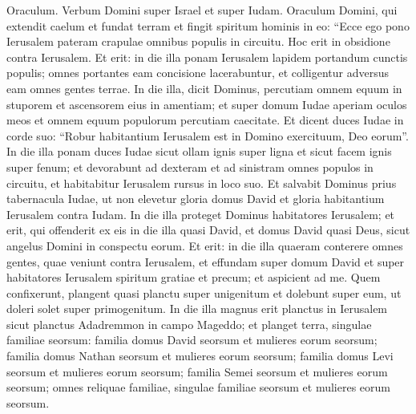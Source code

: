 \begin{biblechapter}  
\verse Oraculum. Verbum Domini super Israel et super Iudam. Oraculum Domini, qui extendit caelum et fundat terram et fingit spiritum hominis in eo: 
\verse “Ecce ego pono Ierusalem pateram crapulae omnibus populis in circuitu. Hoc erit in obsidione contra Ierusalem. 
\verse Et erit: in die illa ponam Ierusalem lapidem portandum cunctis populis; omnes portantes eam concisione lacerabuntur, et colligentur adversus eam omnes gentes terrae. 
\verse In die illa, dicit Dominus, percutiam omnem equum in stuporem et ascensorem eius in amentiam; et super domum Iudae aperiam oculos meos et omnem equum populorum percutiam caecitate. 
\verse Et dicent duces Iudae in corde suo: “Robur habitantium Ierusalem est in Domino exercituum, Deo eorum”. 
\verse In die illa ponam duces Iudae sicut ollam ignis super ligna et sicut facem ignis super fenum; et devorabunt ad dexteram et ad sinistram omnes populos in circuitu, et habitabitur Ierusalem rursus in loco suo. 
\verse Et salvabit Dominus prius tabernacula Iudae, ut non elevetur gloria domus David et gloria habitantium Ierusalem contra Iudam. 
\verse In die illa proteget Dominus habitatores Ierusalem; et erit, qui offenderit ex eis in die illa quasi David, et domus David quasi Deus, sicut angelus Domini in conspectu eorum. 
\verse Et erit: in die illa quaeram conterere omnes gentes, quae veniunt contra Ierusalem, 
\verse et effundam super domum David et super habitatores Ierusalem spiritum gratiae et precum; et aspicient ad me. Quem confixerunt, plangent quasi planctu super unigenitum et dolebunt super eum, ut doleri solet super primogenitum. 
\verse In die illa magnus erit planctus in Ierusalem sicut planctus Adadremmon in campo Mageddo; 
\verse et planget terra, singulae familiae seorsum: familia domus David seorsum et mulieres eorum seorsum; familia domus Nathan seorsum et mulieres eorum seorsum; 
\verse familia domus Levi seorsum et mulieres eorum seorsum; familia Semei seorsum et mulieres eorum seorsum; 
\verse omnes reliquae familiae, singulae familiae seorsum et mulieres eorum seorsum. 
\end{biblechapter}

